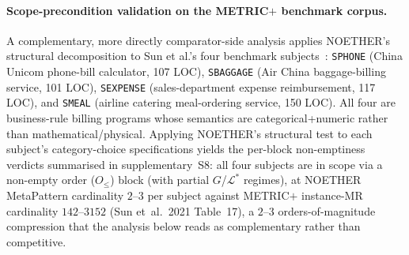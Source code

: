 \documentclass[manuscript]{acmart}
\begin{document}
\paragraph{Scope-precondition validation on the METRIC$+$ benchmark corpus.}
\label{para:metricplus-sun2021-scope}
A complementary, more directly comparator-side analysis applies
NOETHER's structural decomposition to Sun et al.'s four
benchmark subjects~\cite{SunMETRICplus2021}: \texttt{SPHONE} (China
Unicom phone-bill calculator, 107 LOC), \texttt{SBAGGAGE} (Air China
baggage-billing service, 101 LOC), \texttt{SEXPENSE} (sales-department
expense reimbursement, 117 LOC), and \texttt{SMEAL} (airline catering
meal-ordering service, 150 LOC). All four are business-rule billing
programs whose semantics are categorical+numeric rather than
mathematical/physical. Applying NOETHER's structural test to each
subject's category-choice specifications yields the per-block
non-emptiness verdicts summarised in supplementary~S8: all four subjects are in scope via a non-empty order ($O_{\le}$) block (with partial $G$/$\mathcal{L}^{*}$ regimes), at NOETHER MetaPattern cardinality $2$--$3$ per subject against METRIC$+$ instance-MR cardinality $142$--$3152$ (Sun et~al.\ 2021 Table~17), a $2$--$3$ orders-of-magnitude compression that the analysis below reads as complementary rather than competitive.
\end{document}

